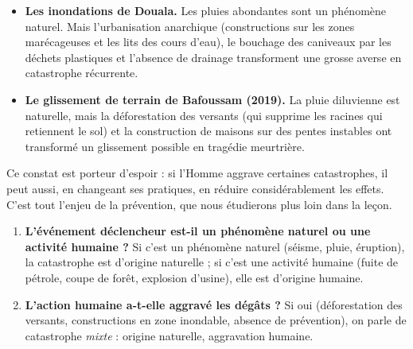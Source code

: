 \documentclass[11pt]{article}
\begin{document}
\begin{exemplebox}
\begin{itemize}
\item \textbf{Les inondations de Douala.} Les pluies abondantes sont un phénomène naturel. Mais l'urbanisation anarchique (constructions sur les zones marécageuses et les lits des cours d'eau), le bouchage des caniveaux par les déchets plastiques et l'absence de drainage transforment une grosse averse en catastrophe récurrente.
\item \textbf{Le glissement de terrain de Bafoussam (2019).} La pluie diluvienne est naturelle, mais la déforestation des versants (qui supprime les racines qui retiennent le sol) et la construction de maisons sur des pentes instables ont transformé un glissement possible en tragédie meurtrière.
\end{itemize}
\end{exemplebox}

Ce constat est porteur d'espoir : si l'Homme aggrave certaines catastrophes, il peut aussi, en changeant ses pratiques, en réduire considérablement les effets. C'est tout l'enjeu de la prévention, que nous étudierons plus loin dans la leçon.

\begin{methode}
\begin{enumerate}
\item \textbf{L'événement déclencheur est-il un phénomène naturel ou une activité humaine ?} Si c'est un phénomène naturel (séisme, pluie, éruption), la catastrophe est d'origine naturelle ; si c'est une activité humaine (fuite de pétrole, coupe de forêt, explosion d'usine), elle est d'origine humaine.
\item \textbf{L'action humaine a-t-elle aggravé les dégâts ?} Si oui (déforestation des versants, constructions en zone inondable, absence de prévention), on parle de catastrophe \emph{mixte} : origine naturelle, aggravation humaine.
\end{enumerate}
\end{methode}
\end{document}
